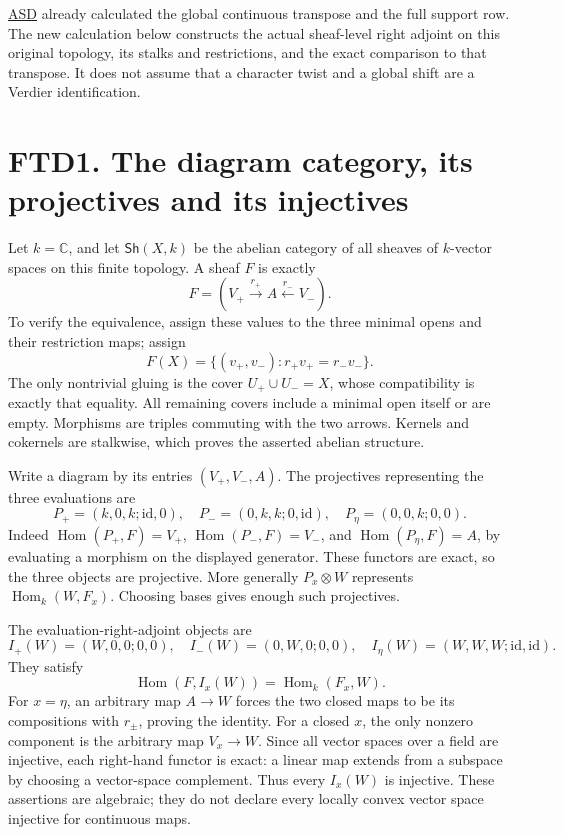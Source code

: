 \href{https://github.com/KokunoYumeto/zeta-function-research-reader/blob/36a82ecca98addb8a98b48204e349737856c7223/workbenches/splitzero-tandem/continuations/20260924-cohomology-weight-and-character-lifts/original-character-lifting/tau_lifting_weights_20260924/ACTUAL_SUPPORTED_DUALITY_INDEPENDENT.md}{ASD}
already calculated the global continuous transpose and the full support
row. The new calculation below constructs the actual sheaf-level right
adjoint on this original topology, its stalks and restrictions, and the
exact comparison to that transpose. It does not assume that a character
twist and a global shift are a Verdier identification.

\section{FTD1. The diagram category, its projectives and its
injectives}\label{ftd1.-the-diagram-category-its-projectives-and-its-injectives}

Let \(k=\mathbb C\), and let \(\mathsf{Sh}(X,k)\) be the abelian
category of all sheaves of \(k\)-vector spaces on this finite topology.
A sheaf \(F\) is exactly \[
F=(V_+\xrightarrow{r_+}A\xleftarrow{r_-}V_-).
\tag{FTD1.1}
\] To verify the equivalence, assign these values to the three minimal
opens and their restriction maps; assign \[
F(X)=\{(v_+,v_-):r_+v_+=r_-v_-\}.
\] The only nontrivial gluing is the cover \(U_+\cup U_-=X\), whose
compatibility is exactly that equality. All remaining covers include a
minimal open itself or are empty. Morphisms are triples commuting with
the two arrows. Kernels and cokernels are stalkwise, which proves the
asserted abelian structure.

Write a diagram by its entries \((V_+,V_-,A)\). The projectives
representing the three evaluations are \[
P_+=(k,0,k;\mathrm{id},0),\quad
P_-=(0,k,k;0,\mathrm{id}),\quad
P_\eta=(0,0,k;0,0).
\tag{FTD1.2}
\] Indeed \(\operatorname{Hom}(P_+,F)=V_+\),
\(\operatorname{Hom}(P_-,F)=V_-\), and
\(\operatorname{Hom}(P_\eta,F)=A\), by evaluating a morphism on the
displayed generator. These functors are exact, so the three objects are
projective. More generally \(P_x\otimes W\) represents
\(\operatorname{Hom}_k(W,F_x)\). Choosing bases gives enough such
projectives.

The evaluation-right-adjoint objects are \[
I_+(W)=(W,0,0;0,0),\quad
I_-(W)=(0,W,0;0,0),\quad
I_\eta(W)=(W,W,W;\mathrm{id},\mathrm{id}).
\tag{FTD1.3}
\] They satisfy \[
\operatorname{Hom}(F,I_x(W))=\operatorname{Hom}_k(F_x,W).
\tag{FTD1.4}
\] For \(x=\eta\), an arbitrary map \(A\to W\) forces the two closed
maps to be its compositions with \(r_\pm\), proving the identity. For a
closed \(x\), the only nonzero component is the arbitrary map
\(V_x\to W\). Since all vector spaces over a field are injective, each
right-hand functor is exact: a linear map extends from a subspace by
choosing a vector-space complement. Thus every \(I_x(W)\) is injective.
These assertions are algebraic; they do not declare every locally convex
vector space injective for continuous maps.

